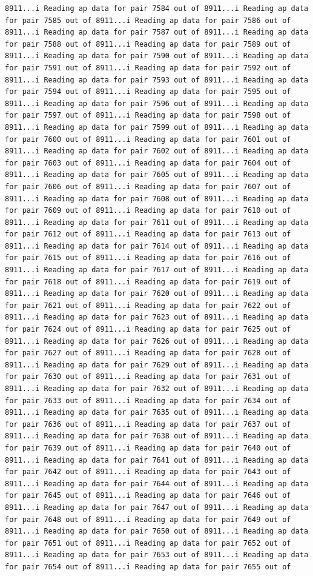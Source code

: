 \documentclass[
]{article}
\begin{document}
\begin{verbatim}
8911...i Reading ap data for pair 7584 out of 8911...i Reading ap data for pair 7585 out of 8911...i Reading ap data for pair 7586 out of 8911...i Reading ap data for pair 7587 out of 8911...i Reading ap data for pair 7588 out of 8911...i Reading ap data for pair 7589 out of 8911...i Reading ap data for pair 7590 out of 8911...i Reading ap data for pair 7591 out of 8911...i Reading ap data for pair 7592 out of 8911...i Reading ap data for pair 7593 out of 8911...i Reading ap data for pair 7594 out of 8911...i Reading ap data for pair 7595 out of 8911...i Reading ap data for pair 7596 out of 8911...i Reading ap data for pair 7597 out of 8911...i Reading ap data for pair 7598 out of 8911...i Reading ap data for pair 7599 out of 8911...i Reading ap data for pair 7600 out of 8911...i Reading ap data for pair 7601 out of 8911...i Reading ap data for pair 7602 out of 8911...i Reading ap data for pair 7603 out of 8911...i Reading ap data for pair 7604 out of 8911...i Reading ap data for pair 7605 out of 8911...i Reading ap data for pair 7606 out of 8911...i Reading ap data for pair 7607 out of 8911...i Reading ap data for pair 7608 out of 8911...i Reading ap data for pair 7609 out of 8911...i Reading ap data for pair 7610 out of 8911...i Reading ap data for pair 7611 out of 8911...i Reading ap data for pair 7612 out of 8911...i Reading ap data for pair 7613 out of 8911...i Reading ap data for pair 7614 out of 8911...i Reading ap data for pair 7615 out of 8911...i Reading ap data for pair 7616 out of 8911...i Reading ap data for pair 7617 out of 8911...i Reading ap data for pair 7618 out of 8911...i Reading ap data for pair 7619 out of 8911...i Reading ap data for pair 7620 out of 8911...i Reading ap data for pair 7621 out of 8911...i Reading ap data for pair 7622 out of 8911...i Reading ap data for pair 7623 out of 8911...i Reading ap data for pair 7624 out of 8911...i Reading ap data for pair 7625 out of 8911...i Reading ap data for pair 7626 out of 8911...i Reading ap data for pair 7627 out of 8911...i Reading ap data for pair 7628 out of 8911...i Reading ap data for pair 7629 out of 8911...i Reading ap data for pair 7630 out of 8911...i Reading ap data for pair 7631 out of 8911...i Reading ap data for pair 7632 out of 8911...i Reading ap data for pair 7633 out of 8911...i Reading ap data for pair 7634 out of 8911...i Reading ap data for pair 7635 out of 8911...i Reading ap data for pair 7636 out of 8911...i Reading ap data for pair 7637 out of 8911...i Reading ap data for pair 7638 out of 8911...i Reading ap data for pair 7639 out of 8911...i Reading ap data for pair 7640 out of 8911...i Reading ap data for pair 7641 out of 8911...i Reading ap data for pair 7642 out of 8911...i Reading ap data for pair 7643 out of 8911...i Reading ap data for pair 7644 out of 8911...i Reading ap data for pair 7645 out of 8911...i Reading ap data for pair 7646 out of 8911...i Reading ap data for pair 7647 out of 8911...i Reading ap data for pair 7648 out of 8911...i Reading ap data for pair 7649 out of 8911...i Reading ap data for pair 7650 out of 8911...i Reading ap data for pair 7651 out of 8911...i Reading ap data for pair 7652 out of 8911...i Reading ap data for pair 7653 out of 8911...i Reading ap data for pair 7654 out of 8911...i Reading ap data for pair 7655 out of 
\end{verbatim}
\end{document}
